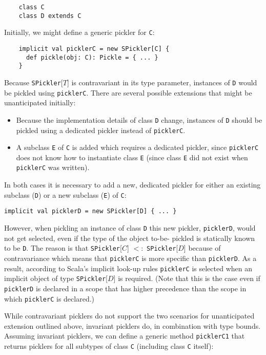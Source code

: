\documentclass[preprint,10pt]{sigplanconf}
\theoremstyle{definition}
\newcommand{\term}[1]{\mbox{\texttt{#1}}}
\begin{document}
\begin{lstlisting}
    class C
    class D extends C
\end{lstlisting}

Initially, we might define a generic pickler for \term{C}:

\begin{lstlisting}
    implicit val picklerC = new SPickler[C] {
      def pickle(obj: C): Pickle = { ... }
    }
\end{lstlisting}

Because \term{SPickler}[$T$] is contravariant in its type parameter, instances
of \term{D} would be pickled using \term{picklerC}. There are several possible
extensions that might be unanticipated initially:

\begin{itemize}
\item Because the implementation details of class \term{D} change, instances
of \term{D} should be pickled using a dedicated pickler instead of
\term{picklerC}.

\item A subclass \term{E} of \term{C} is added which requires a dedicated
pickler, since \term{picklerC} does not know how to instantiate class \term{E}
(since class \term{E} did not exist when \term{picklerC} was written).
\end{itemize}

In both cases it is necessary to add a new, dedicated pickler for either an
existing subclass (\term{D}) or a new subclass (\term{E}) of \term{C}:

\begin{lstlisting}
implicit val picklerD = new SPickler[D] { ... }
\end{lstlisting}

However, when pickling an instance of class \term{D} this new pickler,
\term{picklerD}, would not get selected, even if the type of the object to-be-
pickled is statically known to be \term{D}. The reason is that
\term{SPickler}[$C$] $<:$ \term{SPickler}[$D$] because of contravariance which
means that \term{picklerC} is more specific than \term{picklerD}. As a result,
according to Scala's implicit look-up rules \term{picklerC} is selected when
an implicit object of type \term{SPickler}[$D$] is required. (Note that this
is the case even if \term{picklerD} is declared in a scope that has higher
precedence than the scope in which \term{picklerC} is declared.)

While contravariant picklers do not support the two scenarios for
unanticipated extension outlined above, invariant picklers do, in combination
with type bounds. Assuming invariant picklers, we can define a generic method
\term{picklerC1} that returns picklers for all subtypes of class \term{C}
(including class \term{C} itself):
\end{document}
